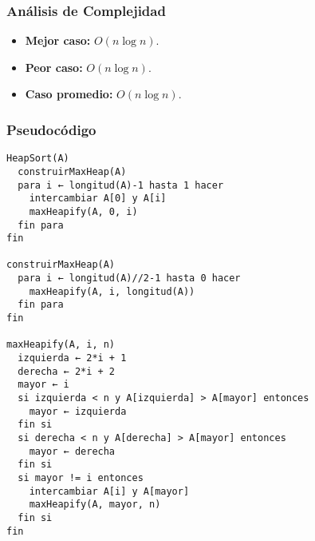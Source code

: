 \documentclass[11pt,openany]{book}
\begin{document}
\subsubsection{Análisis de Complejidad}
\begin{itemize}
    \item \textbf{Mejor caso:} $O(n \log n)$.
    \item \textbf{Peor caso:} $O(n \log n)$.
    \item \textbf{Caso promedio:} $O(n \log n)$.
\end{itemize}

\subsubsection{Pseudocódigo}
\begin{verbatim}
HeapSort(A)
  construirMaxHeap(A)
  para i ← longitud(A)-1 hasta 1 hacer
    intercambiar A[0] y A[i]
    maxHeapify(A, 0, i)
  fin para
fin

construirMaxHeap(A)
  para i ← longitud(A)//2-1 hasta 0 hacer
    maxHeapify(A, i, longitud(A))
  fin para
fin

maxHeapify(A, i, n)
  izquierda ← 2*i + 1
  derecha ← 2*i + 2
  mayor ← i
  si izquierda < n y A[izquierda] > A[mayor] entonces
    mayor ← izquierda
  fin si
  si derecha < n y A[derecha] > A[mayor] entonces
    mayor ← derecha
  fin si
  si mayor != i entonces
    intercambiar A[i] y A[mayor]
    maxHeapify(A, mayor, n)
  fin si
fin
\end{verbatim}
\end{document}
